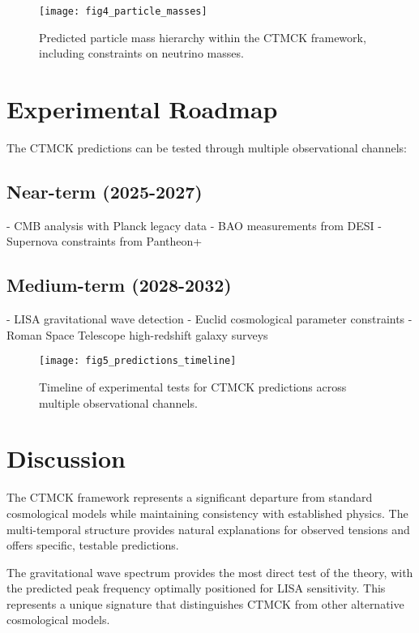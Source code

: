 \documentclass[reprint,amsmath,amssymb,aps,prd,nofootinbib,longbibliography]{revtex4-2}
\begin{document}
\begin{figure}[htb]
\centering
\texttt{[image: fig4\_particle\_masses]}
\caption{Predicted particle mass hierarchy within the CTMCK framework, including constraints on neutrino masses.}
\label{fig:masses}
\end{figure}

\section{Experimental Roadmap}

The CTMCK predictions can be tested through multiple observational channels:

\subsection{Near-term (2025-2027)}
- CMB analysis with Planck legacy data
- BAO measurements from DESI
- Supernova constraints from Pantheon+

\subsection{Medium-term (2028-2032)}
- LISA gravitational wave detection
- Euclid cosmological parameter constraints
- Roman Space Telescope high-redshift galaxy surveys

\begin{figure}[htb]
\centering
\texttt{[image: fig5\_predictions\_timeline]}
\caption{Timeline of experimental tests for CTMCK predictions across multiple observational channels.}
\label{fig:roadmap}
\end{figure}

\section{Discussion}

The CTMCK framework represents a significant departure from standard cosmological models while maintaining consistency with established physics. The multi-temporal structure provides natural explanations for observed tensions and offers specific, testable predictions.

The gravitational wave spectrum provides the most direct test of the theory, with the predicted peak frequency optimally positioned for LISA sensitivity. This represents a unique signature that distinguishes CTMCK from other alternative cosmological models.
\end{document}
